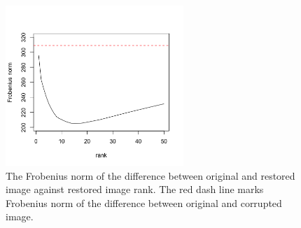 \documentclass[12pt]{article}
\begin{document}
	\begin{figure}[!htbp]
		\centering
		\includegraphics[width=0.6\textwidth]{norm2rank}
		\caption{The Frobenius norm of the difference between original and restored image against restored image rank. The red dash line marks Frobenius norm of the difference between original and corrupted image.}
		\label{fig:norm}
	\end{figure}
	
\end{document}
